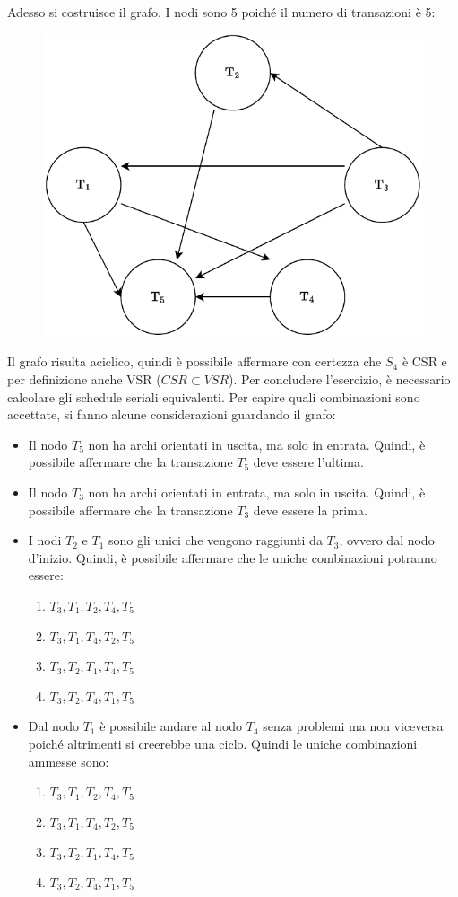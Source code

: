 \documentclass[a4paper]{article}
\begin{document}
	\noindent
	Adesso si costruisce il grafo. I nodi sono 5 poiché il numero di transazioni è 5:
	\begin{figure}[!htp]
		\centering
		\includegraphics[width=.7\textwidth]{img/CSR-3.pdf}
	\end{figure}

	\noindent
	Il grafo risulta aciclico, quindi è possibile affermare con certezza che $S_{4}$ è CSR e per definizione anche VSR ($CSR \subset VSR$). Per concludere l'esercizio, è necessario calcolare gli schedule seriali equivalenti. Per capire quali combinazioni sono accettate, si fanno alcune considerazioni guardando il grafo:
	\begin{itemize}
		\item Il nodo $T_{5}$ non ha archi orientati in uscita, ma solo in entrata. Quindi, è possibile affermare che la transazione $T_{5}$ deve essere l'ultima.
		
		\item Il nodo $T_{3}$ non ha archi orientati in entrata, ma solo in uscita. Quindi, è possibile affermare che la transazione $T_{3}$ deve essere la prima.
		
		\item I nodi $T_{2}$ e $T_{1}$ sono gli unici che vengono raggiunti da $T_{3}$, ovvero dal nodo d'inizio. Quindi, è possibile affermare che le uniche combinazioni potranno essere:
		\begin{enumerate}
			\item $T_{3}, T_{1}, T_{2}, T_{4}, T_{5}$
			\item $T_{3}, T_{1}, T_{4}, T_{2}, T_{5}$
			\item $T_{3}, T_{2}, T_{1}, T_{4}, T_{5}$
			\item $T_{3}, T_{2}, T_{4}, T_{1}, T_{5}$
		\end{enumerate}

		\item Dal nodo $T_{1}$ è possibile andare al nodo $T_{4}$ senza problemi ma non viceversa poiché altrimenti si creerebbe una ciclo. Quindi le uniche combinazioni ammesse sono:
		\begin{enumerate}
			\item $T_{3}, T_{1}, T_{2}, T_{4}, T_{5}$
			\item $T_{3}, T_{1}, T_{4}, T_{2}, T_{5}$
			\item $T_{3}, T_{2}, T_{1}, T_{4}, T_{5}$
			\item $T_{3}, T_{2}, T_{4}, T_{1}, T_{5}$
		\end{enumerate}
	\end{itemize}\newpage
	
\end{document}
